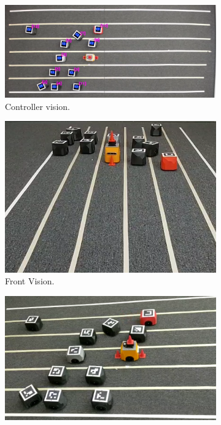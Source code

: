 \begin{appendix}

\begin{figure}[H]
\centering
\begin{subfigure}[t]{\textwidth}
    \includegraphics[width=\textwidth]{Anexos/obs_avoid/obs_avoid_it10_cam0.png}
    \caption{Controller vision.}
    \label{fig:first}
\end{subfigure}
\vspace{1cm}
\begin{subfigure}[b]{0.4\textwidth}
    \includegraphics[width=\textwidth]{Anexos/obs_avoid/obs_avoid_it10_cam1.png}
    \caption{Front Vision.}
    \label{fig:second}
\end{subfigure}
\hfill
\begin{subfigure}[b]{0.50\textwidth}
    \includegraphics[width=\textwidth]{Anexos/obs_avoid/obs_avoid_it10_cam2.png}

\end{subfigure}
\end{figure}
\end{appendix}
